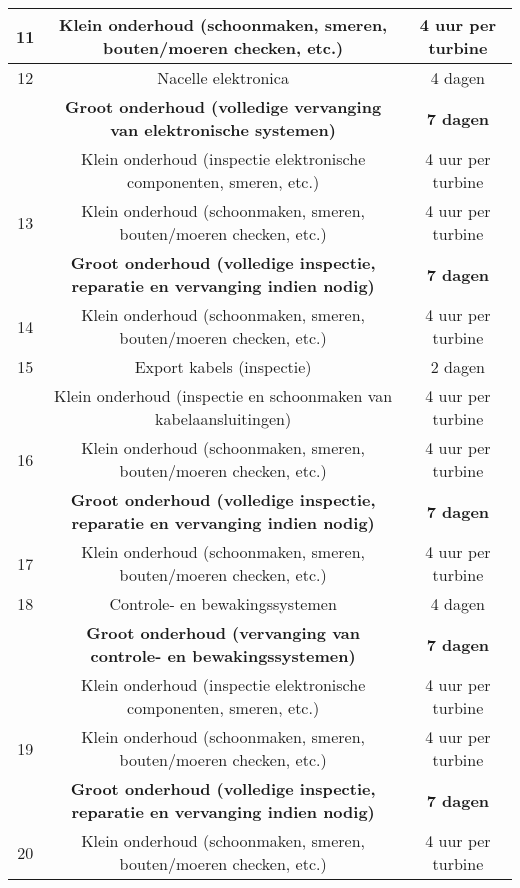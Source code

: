 \begin{table}[H]
{\begin{tabular}{|c|c|c|}
\hline
11 & Klein onderhoud (schoonmaken, smeren, bouten/moeren checken, etc.) & 4 uur per turbine \\
\hline
12 & Nacelle elektronica & 4 dagen \\
   & \cellcolor{gray!25} \textbf{Groot onderhoud (volledige vervanging van elektronische systemen)} & \cellcolor{gray!25} \textbf{7 dagen} \\
   & Klein onderhoud (inspectie elektronische componenten, smeren, etc.) & 4 uur per turbine \\
\hline
13 & Klein onderhoud (schoonmaken, smeren, bouten/moeren checken, etc.) & 4 uur per turbine \\
  & \cellcolor{gray!25} \textbf{Groot onderhoud (volledige inspectie, reparatie en vervanging indien nodig)} & \cellcolor{gray!25} \textbf{7 dagen} \\
\hline
14 & Klein onderhoud (schoonmaken, smeren, bouten/moeren checken, etc.) & 4 uur per turbine \\
\hline
15 & Export kabels (inspectie) & 2 dagen \\
   & Klein onderhoud (inspectie en schoonmaken van kabelaansluitingen) & 4 uur per turbine \\
\hline
16 & Klein onderhoud (schoonmaken, smeren, bouten/moeren checken, etc.) & 4 uur per turbine \\
  & \cellcolor{gray!25} \textbf{Groot onderhoud (volledige inspectie, reparatie en vervanging indien nodig)} & \cellcolor{gray!25} \textbf{7 dagen} \\
\hline
17 & Klein onderhoud (schoonmaken, smeren, bouten/moeren checken, etc.) & 4 uur per turbine \\
\hline
18 & Controle- en bewakingssystemen & 4 dagen \\
   & \cellcolor{gray!25} \textbf{Groot onderhoud (vervanging van controle- en bewakingssystemen)} & \cellcolor{gray!25} \textbf{7 dagen} \\
   & Klein onderhoud (inspectie elektronische componenten, smeren, etc.) & 4 uur per turbine \\
\hline
19 & Klein onderhoud (schoonmaken, smeren, bouten/moeren checken, etc.) & 4 uur per turbine \\
  & \cellcolor{gray!25} \textbf{Groot onderhoud (volledige inspectie, reparatie en vervanging indien nodig)} & \cellcolor{gray!25} \textbf{7 dagen} \\
\hline
20 & Klein onderhoud (schoonmaken, smeren, bouten/moeren checken, etc.) & 4 uur per turbine \\

\end{tabular}}
\end{table}
